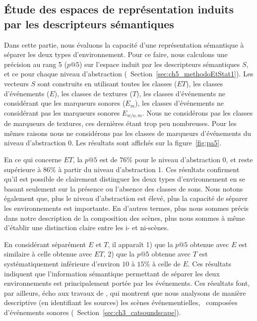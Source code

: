 \subsection[Espaces de représentation induits par les descripteurs sémantiques]{Étude des espaces de représentation induits par les descripteurs sémantiques}

Dans cette partie, nous évaluons la capacité d'une représentation sémantique à séparer les deux types d'environnement. Pour ce faire, nous calculons une précision au rang 5 ($p@5$) sur l'espace induit par les descripteurs sémantiques $S$, et ce pour chaque niveau d'abstraction (\cf~Section~\ref{sec:ch5_methodoEtStat1}). Les vecteurs $S$ sont construits en utilisant toutes les classes ($ET$), les classes d'événements ($E$), les classes de textures ($T$), les classes d'événements ne considérant que les marqueurs sonores ($E_m$), les classes d'événements ne considérant pas les marqueurs sonores $E_{w/o,m}$. Nous ne considérons pas les classes de marqueurs de textures, ces dernières étant trop peu nombreuses. Pour les mêmes raisons nous ne considérons pas les classes de marqueurs d'événements du niveau d'abstraction $0$. Les résultats sont affichés sur la figure~\ref{fig:pa5}.

En ce qui concerne $ET$, la $p@5$ est de $76\%$ pour le niveau d'abstraction 0, et reste supérieure à $86\%$ à partir du niveau d'abstraction 1. Ces résultats confirment qu'il est possible de clairement distinguer les deux types d'environnement en se basant seulement sur la présence ou l'absence des classes de sons. Nous notons également que, plus le niveau d'abstraction est élevé, plus la capacité de séparer les environnements est importante. En d'autres termes, plus nous sommes précis dans notre description de la composition des scènes, plus nous sommes à même d'établir une distinction claire entre les i- et ni-scènes.

En considérant séparément $E$ et $T$, il apparaît 1) que la $p@5$ obtenue avec $E$ est similaire à celle obtenue avec $ET$, 2) que la $p@5$ obtenue avec $T$ est systématiquement inférieure d'environ $10$ à $15\%$ à celle de $E$. Ces résultats indiquent que l'information sémantique permettant de séparer les deux environnements est principalement portée par les événements. Ces résultats font, par ailleurs, écho aux travaux de  \citep{maffiolo_caracterisation_1999}, qui montrent que nous analysons de manière descriptive (en identifiant les sources) les scènes événementielles, \ie~composées d'événements sonores (\cf~Section~\ref{sec:ch3_catsoundscape}).

